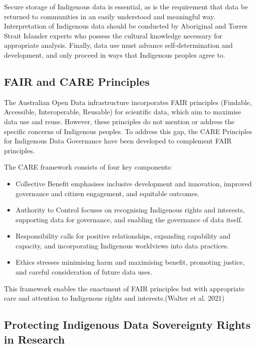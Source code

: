 \documentclass[
  a4paper,
]{memoir}
\begin{document}
Secure storage of Indigenous data is essential, as is the requirement
that data be returned to communities in an easily understood and
meaningful way. Interpretation of Indigenous data should be conducted by
Aboriginal and Torres Strait Islander experts who possess the cultural
knowledge necessary for appropriate analysis. Finally, data use must
advance self-determination and development, and only proceed in ways
that Indigenous peoples agree to.

\subsection{FAIR and CARE Principles}\label{fair-and-care-principles}

The Australian Open Data infrastructure incorporates FAIR principles
(Findable, Accessible, Interoperable, Reusable) for scientific data,
which aim to maximise data use and reuse. However, these principles do
not mention or address the specific concerns of Indigenous peoples. To
address this gap, the CARE Principles for Indigenous Data Governance
have been developed to complement FAIR principles.

The CARE framework consists of four key components:

\begin{itemize}
\item
  Collective Benefit emphasises inclusive development and innovation,
  improved governance and citizen engagement, and equitable outcomes.
\item
  Authority to Control focuses on recognising Indigenous rights and
  interests, supporting data for governance, and enabling the governance
  of data itself.
\item
  Responsibility calls for positive relationships, expanding capability
  and capacity, and incorporating Indigenous worldviews into data
  practices.
\item
  Ethics stresses minimising harm and maximising benefit, promoting
  justice, and careful consideration of future data uses.
\end{itemize}

This framework enables the enactment of FAIR principles but with
appropriate care and attention to Indigenous rights and
interests.(Walter et al. 2021)

\subsection{Protecting Indigenous Data Sovereignty Rights in
Research}\label{protecting-indigenous-data-sovereignty-rights-in-research}
\end{document}
